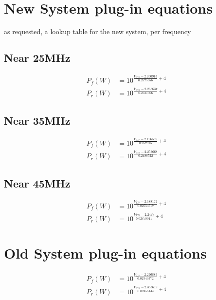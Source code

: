 \documentclass{report}
\begin{document}
\section{New System plug-in equations}
as requested, a lookup table for the new system, per frequency
\subsection{Near 25MHz}
\begin{eqnarray}
    P_f(W) &= 10^{\frac{V_{\text{ICF}}-2.200913}{0.2575556}+ 4}\\
    P_r(W) &= 10^{\frac{V_{\text{ICR}}-2.268637}{0.2521306}+ 4}
\end{eqnarray}
\subsection{Near 35MHz}
\begin{eqnarray}
    P_f(W) &= 10^{\frac{V_{\text{ICF}}-2.196569}{0.257915} + 4}\\
    P_r(W) &= 10^{\frac{V_{\text{ICR}}-2.253668}{0.2488522} + 4}
\end{eqnarray}
\subsection{Near 45MHz}
\begin{eqnarray}
    P_f(W) &= 10^{\frac{V_{\text{ICF}}-2.188172}{0.02554517} + 4}\\
    P_r(W) &= 10^{\frac{V_{\text{ICR}}-2.2447}{0.02478911}+ 4}
\end{eqnarray}
\section{Old System plug-in equations}
\begin{eqnarray}
    P_f(W) &= 10^{\frac{V_{\text{ICF}}-2.296889}{0.02543572}+ 4}\\
    P_r(W) &= 10^{\frac{V_{\text{ICR}}-2.353619}{0.02456144}+ 4}
\end{eqnarray}
\end{document}
